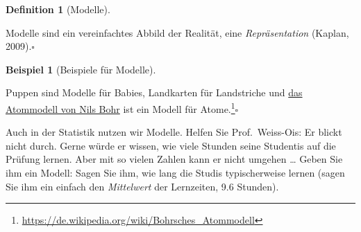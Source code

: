\documentclass[
  letterpaper,
]{scrbook}
\theoremstyle{definition}
\newtheorem{example}{Beispiel}[chapter]
\theoremstyle{definition}
\newtheorem{definition}{Definition}[chapter]
\theoremstyle{definition}
\theoremstyle{remark}
\begin{document}
\begin{definition}[Modelle]\protect\hypertarget{def-modelle}{}\label{def-modelle}

Modelle sind ein vereinfachtes Abbild der Realität, eine
\emph{Repräsentation} (Kaplan, 2009).\(\square\)

\end{definition}

\begin{example}[Beispiele für
Modelle]\protect\hypertarget{exm-Modelle}{}\label{exm-Modelle}

Puppen sind Modelle für Babies, Landkarten für Landstriche und
\href{https://de.wikipedia.org/wiki/Bohrsches_Atommodell}{das Atommodell
von Nils Bohr} ist ein Modell für Atome.\footnote{\url{https://de.wikipedia.org/wiki/Bohrsches_Atommodell}}\(\square\)

\end{example}

Auch in der Statistik nutzen wir Modelle. Helfen Sie Prof.~Weiss-Ois: Er
blickt nicht durch. Gerne würde er wissen, wie viele Stunden seine
Studentis auf die Prüfung lernen. Aber mit so vielen Zahlen kann er
nicht umgehen \ldots{} Geben Sie ihm ein Modell: Sagen Sie ihm, wie lang
die Studis typischerweise lernen (sagen Sie ihm ein einfach den
\emph{Mittelwert} der Lernzeiten, 9.6 Stunden).
\end{document}
